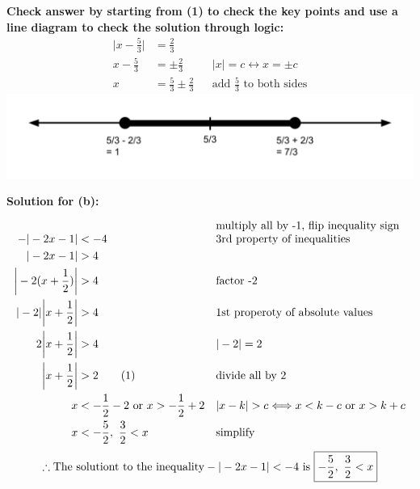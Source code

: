 \documentclass[12pt]{book}
\newcommand\numberthis{\addtocounter{equation}{1}\tag{\theequation}}
\begin{document}
\begin{enumerate}
\vspace{0.5em}
\textbf{Check answer by starting from (1) to check the key points and use a line diagram to check the solution through logic:}
\vspace{0.2em}
\addtolength{\jot}{0em}
\begin{align*}
    \bigg|x - \frac{5}{3} \bigg| & = \frac{2}{3}\\
    x - \frac{5}{3} & = \pm \frac{2}{3} && |x| = c \longleftrightarrow x = \pm c\\
    x & = \frac{5}{3} \pm \frac{2}{3} && \text{add $\frac{5}{3}$ to both sides}
\end{align*}
\includegraphics[width=\linewidth]{A1-2 proof 1 (1).png}

\clearpage
\vspace{0.3cm} 
\textbf{Solution for (b):}
\vspace{-1.5em}

\addtolength{\jot}{0.3em}
\begin{align*}
    -|-2x-1| & < -4 && \text{\shortstack[l]{multiply all by -1, flip inequality sign \\ 3rd property of inequalities}} \\
    |-2x-1| & > 4 \\
    \bigg|-2(x+\frac{1}{2})\bigg| & > 4 && \text{factor -2} \\
    |-2|\bigg|x+\frac{1}{2}\bigg| & > 4 && \text{1st properoty of absolute values} \\
    2\bigg|x+\frac{1}{2}\bigg| & > 4 && |-2| = 2 \\
    \bigg|x+\frac{1}{2}\bigg| & > 2  \numberthis && \text{divide all by 2} \\
    x & < -\frac{1}{2} - 2 \text{ or } x > -\frac{1}{2} + 2 && |x-k| > c \Longleftrightarrow x < k-c \text{ or } x > k+c \\
    x & < -\frac{5}{2}, \text{\space} \frac{3}{2} < x && \text{simplify}
\end{align*}
$$ \therefore \text{The solutiont to the inequality} -|-2x-1| < -4 \text{ is } \boxed{-\frac{5}{2}, \text{\space} \frac{3}{2} < x} $$


\end{enumerate}
\end{document}
